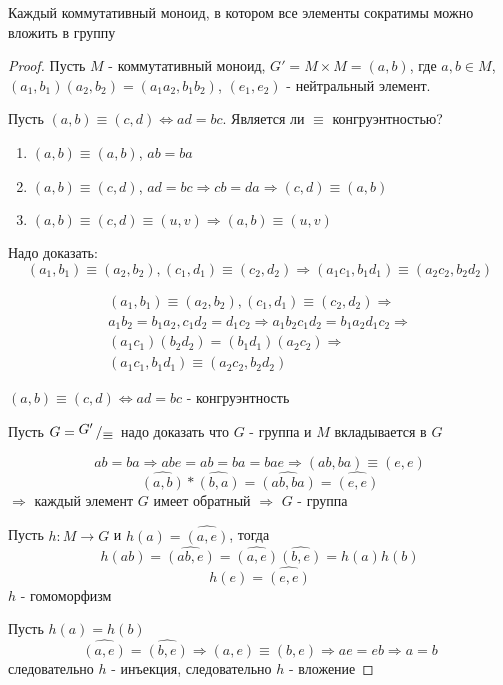 \documentclass[../main/document.tex]{subfiles}
\begin{document}
\begin{thm}
Каждый коммутативный моноид, в котором все элементы сократимы можно вложить в группу
\begin{proof}
Пусть $M$ - коммутативный моноид, $G'=M\times M=(a,b)$, где $a,b\in M$, $(a_1,b_1)(a_2,b_2)=(a_1a_2,b_1b_2)$, $(e_1,e_2)$ - нейтральный элемент.

Пусть $(a,b)\equiv (c,d)\Leftrightarrow ad=bc$. Является ли $\equiv$ конгруэнтностью?

\begin{enumerate}
\item $(a,b)\equiv(a,b)$, $ab=ba$
\item $(a,b)\equiv(c,d)$, $ad=bc\Rightarrow cb=da\Rightarrow (c,d)\equiv (a,b)$ 
\item $(a,b)\equiv(c,d)\equiv(u,v)\Rightarrow(a,b)\equiv(u,v)$
\end{enumerate}

Надо доказать:
$$(a_1,b_1)\equiv(a_2,b_2), (c_1,d_1)\equiv(c_2,d_2)\Rightarrow(a_1c_1,b_1d_1)\equiv(a_2c_2,b_2d_2)$$

\begin{multline*}
(a_1,b_1)\equiv(a_2,b_2), (c_1,d_1)\equiv(c_2,d_2)\Rightarrow \\ 
a_1b_2=b_1a_2, c_1d_2=d_1c_2\Rightarrow a_1b_2c_1d_2=b_1a_2d_1c_2\Rightarrow \\
 (a_1c_1)(b_2d_2)=(b_1d_1)(a_2c_2)\Rightarrow \\
 (a_1c_1,b_1d_1)\equiv(a_2c_2,b_2d_2)
\end{multline*}

$(a,b)\equiv (c,d)\Leftrightarrow ad=bc$ - конгруэнтность
\vspace{1em}

Пусть $G = \bigslant{G'}{\equiv}$ надо доказать что $G$ - группа и $M$ вкладывается в $G$

$$ab=ba\Rightarrow abe=ab=ba=bae\Rightarrow (ab,ba)\equiv(e,e)$$
$$\widehat{(a,b)}*\widehat{(b,a)}=\widehat{(ab,ba)}=\widehat{(e,e)}$$
$\Rightarrow$ каждый элемент $G$ имеет обратный $\Rightarrow$ $G$ - группа

Пусть $h:M\rightarrow G$ и $h(a)=\widehat{(a,e)}$, тогда
$$h(ab)=\widehat{(ab,e)}=\widehat{(a,e)}\widehat{(b,e)}=h(a)h(b)$$
$$h(e)=\widehat{(e,e)}$$
$h$ - гомоморфизм

Пусть $h(a)=h(b)$
$$\widehat{(a,e)}=\widehat{(b,e)}\Rightarrow (a,e)\equiv(b,e)\Rightarrow ae=eb \Rightarrow a=b$$
следовательно $h$ - инъекция, следовательно $h$ - вложение

\end{proof}
\end{thm}
\begin{exm}
\end{exm}
\end{document}
